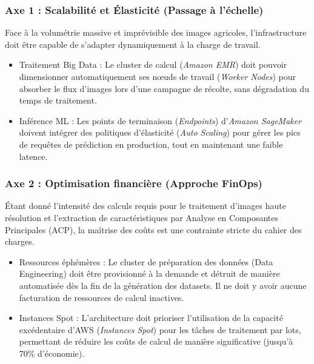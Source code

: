 \subsubsection{Axe 1 : Scalabilité et Élasticité (Passage à l'échelle)}
Face à la volumétrie massive et imprévisible des images agricoles, l'infrastructure doit être capable de s'adapter dynamiquement à la charge de travail.
\begin{itemize}
    \item[$\bullet$] Traitement Big Data : Le cluster de calcul (\textit{Amazon EMR}) doit pouvoir dimensionner automatiquement ses nœuds de travail (\textit{Worker Nodes}) pour absorber le flux d'images lors d'une campagne de récolte, sans dégradation du temps de traitement.
    \item[$\bullet$] Inférence ML : Les points de terminaison (\textit{Endpoints}) d'\textit{Amazon SageMaker} doivent intégrer des politiques d'élasticité (\textit{Auto Scaling}) pour gérer les pics de requêtes de prédiction en production, tout en maintenant une faible latence.
\end{itemize}

\subsubsection{Axe 2 : Optimisation financière (Approche FinOps)}
Étant donné l'intensité des calculs requis pour le traitement d'images haute résolution et l'extraction de caractéristiques par Analyse en Composantes Principales (ACP), la maîtrise des coûts est une contrainte stricte du cahier des charges.
\begin{itemize}
    \item[$\bullet$] Ressources éphémères : Le cluster de préparation des données (Data Engineering) doit être provisionné à la demande et détruit de manière automatisée dès la fin de la génération des datasets. Il ne doit y avoir aucune facturation de ressources de calcul inactives.
    \item[$\bullet$] Instances Spot : L'architecture doit prioriser l'utilisation de la capacité excédentaire d'AWS (\textit{Instances Spot}) pour les tâches de traitement par lots, permettant de réduire les coûts de calcul de manière significative (jusqu'à 70\% d'économie).
\end{itemize}

